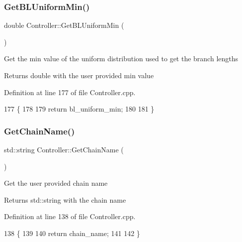 \subsubsection{\texorpdfstring{Get\+B\+L\+Uniform\+Min()}{GetBLUniformMin()}}
{\footnotesize\ttfamily double Controller\+::\+Get\+B\+L\+Uniform\+Min (\begin{DoxyParamCaption}{ }\end{DoxyParamCaption})}

Get the min value of the uniform distribution used to get the branch lengths \begin{DoxyReturn}{Returns}
double with the user provided min value 
\end{DoxyReturn}


Definition at line 177 of file Controller.\+cpp.


\begin{DoxyCode}
177                                   \{
178   
179   \textcolor{keywordflow}{return} bl\_uniform\_min;
180   
181 \}
\end{DoxyCode}
\mbox{\label{classController_a62139e7d2c85afb9046dd47528882089}} 
\subsubsection{\texorpdfstring{Get\+Chain\+Name()}{GetChainName()}}
{\footnotesize\ttfamily std\+::string Controller\+::\+Get\+Chain\+Name (\begin{DoxyParamCaption}{ }\end{DoxyParamCaption})}

Get the user provided chain name \begin{DoxyReturn}{Returns}
std\+::string with the chain name 
\end{DoxyReturn}


Definition at line 138 of file Controller.\+cpp.


\begin{DoxyCode}
138                                    \{
139   
140     \textcolor{keywordflow}{return} chain\_name;
141   
142 \}
\end{DoxyCode}
\mbox{\label{classController_acee3589ec24f9a9432c07f2fe77f005b}} 

